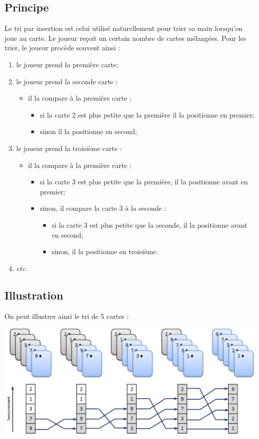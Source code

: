 \documentclass[11pt,oneside]{article}
\begin{document}
\subsection{Principe}
Le tri par insertion est celui utilisé naturellement pour trier sa main lorsqu'on joue au carte. Le joueur reçoit un certain nombre de cartes mélangées. Pour les trier, le joueur procède souvent ainsi :
\begin{enumerate}
\item le joueur prend la première carte;
\item le joueur prend la seconde carte :
\begin{itemize}
\item il la compare à la première carte :
\begin{itemize}
\item si la carte 2 est plus petite que la première il la positionne en premier;
\item sinon il la positionne en second;
\end{itemize}
\end{itemize}
\item le joueur prend la troisième carte :
\begin{itemize}
\item il la compare à la première carte :
\begin{itemize}
\item si la carte 3 est plus petite que la première, il la positionne avant en premier;
\item sinon, il compare la carte 3 à la seconde :
\begin{itemize}
\item si la carte 3 est plus petite que la seconde, il la positionne avant en second;
\item sinon, il la positionne en troisième.
\end{itemize}
\end{itemize}
\end{itemize}
\item \textit{etc.}
\end{enumerate}

\subsection{Illustration}
On peut illustrer ainsi le tri de 5 cartes :
\begin{center}
\includegraphics[width=\textwidth]{png/insertion}
\end{center}
\end{document}

